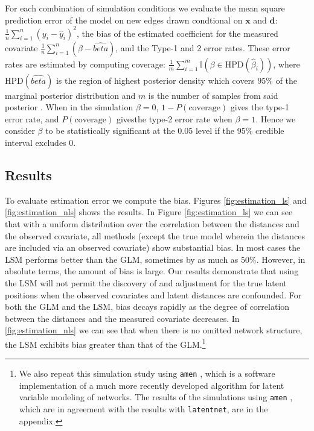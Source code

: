 \documentclass[11pt]{article}
\begin{document}
For each combination of simulation conditions we evaluate the mean
square prediction error of the model on new edges drawn condtional on
$\mathbf{x}$ and $\mathbf{d}$: $\frac{1}{n}\sum_{i=1}^{n}(y_{i} - \hat{y}_i)^2$, the bias of the estimated coefficient
for the measured covariate $\frac{1}{n} \sum_{i=1}^n (\beta - \hat{beta})$, and the Type-1 and 2 error
rates. These error rates are estimated by computing coverage: $\frac{1}{m} \sum_{i=1}^m\mathbb{I}(\beta \in \text{HPD}(\hat{\beta}_i))$, where $\text{HPD}(\hat{beta})$ is the region of highest posterior density which covers $95\%$ of the marginal posterior distribution and $m$ is the number of samples from said posterior \cite{turkkan1993computation}. When in the simulation $\beta = 0$, $1 - P(\text{coverage})$ gives the type-1 error rate, and $P(\text{coverage})$ givesthe type-2 error rate when $\beta = 1$. Hence we consider $\beta$ to be statistically
significant at the 0.05 level if the 95\% credible interval excludes 0. 

\subsection{Results}

To evaluate estimation error we compute the bias. Figures
\ref{fig:estimation_ls} and \ref{fig:estimation_nls} shows the
results. In Figure \ref{fig:estimation_ls} we can see that with a
uniform distribution over the correlation between the distances and
the observed covariate, all methods (except the true model wherein the
distances are included via an observed covariate) show substantial
bias. In most cases the LSM performs better than the GLM, sometimes by
as much as $50\%$. However, in absolute terms, the amount of bias is
large. Our results demonstrate that using the LSM will not permit the
discovery of and adjustment for the true latent positions when the
observed covariates and latent distances are confounded.  For both the
GLM and the LSM, bias decays rapidly as the degree of correlation
between the distances and the measured covariate decreases. In
\ref{fig:estimation_nls} we can see that when there is no omitted
network structure, the LSM exhibits bias greater than that of the GLM.\footnote{ We also repeat this simulation study using \texttt{amen}
\citep{hoff2015dyadic, minhas2016inferential,amen},  which is a software implementation of a much more recently developed algorithm for latent variable modeling of networks. The results of the simulations using \texttt{amen} , which are in agreement with the results with \texttt{latentnet}, are in the appendix.}
\end{document}
